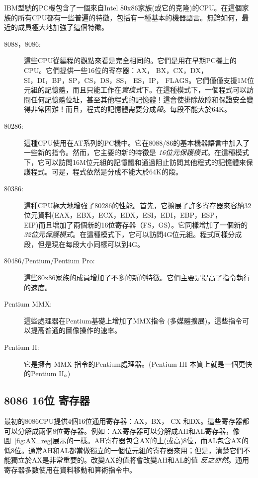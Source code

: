 IBM型號的PC機包含了一個來自Intel
80x86家族(或它的克隆)的CPU。在這個家族的所有CPU都有一些普遍的特徵，包括有一種基本的機器語言。無論如何，最近的成員極大地加強了這個特徵。
\begin{description}

\item[8088，8086:] 這些CPU從編程的觀點來看是完全相同的。它們是用在早期PC機上的CPU。它們提供一些16位的寄存器：AX，
BX，CX，DX，\\
SI，DI，BP，SP，CS，DS，SS， ES，IP，
FLAGS。它們僅僅支援1M位元組的記憶體，而且只能工作在\emph{實模式}下。在這種模式下，一個程式可以訪問任何記憶體位址，甚至其他程式的記憶體！這會使排除故障和保證安全變得非常困難！而且，程式的記憶體需要分成\emph{段}。每段不能大於64K。


\item[80286:] 這種CPU使用在AT系列的PC機中。它在8088/86的基本機器語言中加入了一些新的指令。然而，它主要的新的特徵是 \emph{16位元保護模式}。在這種模式下，它可以訪問16M位元組的記憶體和通過阻止訪問其他程式的記憶體來保護程式。可是，程式依然是分成不能大於64K的段。

\item[80386:]
這種CPU極大地增強了80286的性能。首先，它擴展了許多寄存器來容納32位元資料(EAX，EBX，ECX，EDX，ESI，EDI，EBP，ESP，\\
EIP)而且增加了兩個新的16位寄存器（FS，GS）。它同樣增加了一個新的\emph{32位元保護模式}。在這種模式下，它可以訪問4G位元組。程式同樣分成段，但是現在每段大小同樣可以到4G。

\item[80486/Pentium/Pentium Pro:] 這些80x86家族的成員增加了不多的新的特徵。它們主要是提高了指令執行的速度。

\item[Pentium MMX:] 這些處理器在Pentium基礎上增加了MMX指令 (多媒體擴展)。這些指令可以提高普通的圖像操作的速率。

\item[Pentium II:] 它是擁有 MMX 指令的Pentium處理器。(Pentium III 本質上就是一個更快的Pentium II。)
\end{description}

\subsection{8086 16位 寄存器}

最初的8086CPU提供4個16位通用寄存器：AX，BX， CX
和DX。這些寄存器都可以分解成兩個8位寄存器。例如：AX寄存器可以分解成AH和AL寄存器，像圖~\ref{fig:AX_reg}展示的一樣。AH寄存器包含AX的上(或高)8位，而AL包含AX的低8位。通常AH和AL都當做獨立的一個位元組的寄存器來用；但是，清楚它們不能獨立於AX是非常重要的。改變AX的值將會改變AH和AL的值{\em
反之亦然}\/。通用寄存器多數使用在資料移動和算術指令中。

